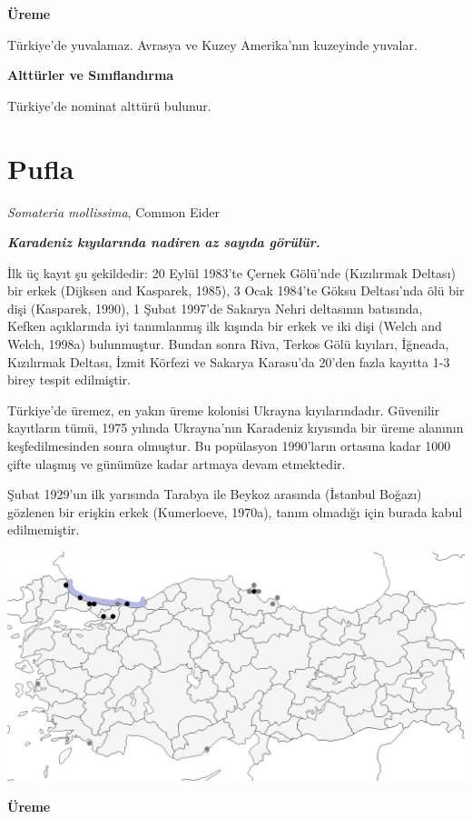 \documentclass[
  a4paper,
  DIV=11,
  numbers=noendperiod]{scrartcl}
\begin{document}
\textbf{Üreme}

Türkiye'de yuvalamaz. Avrasya ve Kuzey Amerika'nın kuzeyinde yuvalar.

\textbf{Alttürler ve Sınıflandırma}

Türkiye'de nominat alttürü bulunur.

\section{Pufla}\label{pufla}

\emph{Somateria mollissima}, Common Eider

\textbf{\emph{Karadeniz kıyılarında nadiren az sayıda görülür.}}

İlk üç kayıt şu şekildedir: 20 Eylül 1983'te Çernek Gölü'nde (Kızılırmak
Deltası) bir erkek (Dijksen and Kasparek, 1985), 3 Ocak 1984'te Göksu
Deltası'nda ölü bir dişi (Kasparek, 1990), 1 Şubat 1997'de Sakarya Nehri
deltasının batısında, Kefken açıklarında iyi tanımlanmış ilk kışında bir
erkek ve iki dişi (Welch and Welch, 1998a) bulunmuştur. Bundan sonra
Riva, Terkos Gölü kıyıları, İğneada, Kızılırmak Deltası, İzmit Körfezi
ve Sakarya Karasu'da 20'den fazla kayıtta 1-3 birey tespit edilmiştir.

Türkiye'de üremez, en yakın üreme kolonisi Ukrayna kıyılarındadır.
Güvenilir kayıtların tümü, 1975 yılında Ukrayna'nın Karadeniz kıyısında
bir üreme alanının keşfedilmesinden sonra olmuştur. Bu popülasyon
1990'ların ortasına kadar 1000 çifte ulaşmış ve günümüze kadar artmaya
devam etmektedir.

Şubat 1929'un ilk yarısında Tarabya ile Beykoz arasında (İstanbul
Boğazı) gözlenen bir erişkin erkek (Kumerloeve, 1970a), tanım olmadığı
için burada kabul edilmemiştir.

\includegraphics{images/harita_Somateria mollissima.png}

\textbf{Üreme}
\end{document}
